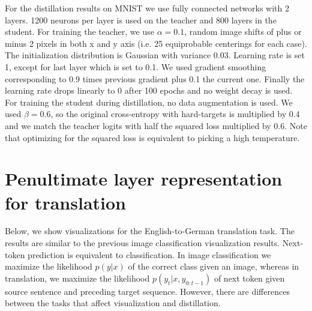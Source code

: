 \documentclass{article}
\begin{document}
For the distillation results on MNIST we use fully connected networks with 2 layers. 1200 neurons per layer is used on the teacher and 800 layers in the student. For training the teacher, we use $\alpha = 0.1$, random image shifts of plus or minus 2 pixels in both x and y axis (i.e. 25 equiprobable centerings for each case). The initialization distribution is Gaussian with variance 0.03. Learning rate is set 1, except for last layer which is set to 0.1. We used gradient smoothing corresponding to 0.9 times previous gradient plus 0.1 the current one. Finally the learning rate drops linearly to 0 after 100 epochs and no weight decay is used. For training the student during distillation, no data augmentation is used. We used $\beta = 0.6$, so the original cross-entropy with hard-targets is multiplied by 0.4 and we match the teacher logits with half the squared loss multiplied by 0.6. Note that optimizing for the squared loss is equivalent to picking a high temperature.

\section{Penultimate layer representation for translation}

Below, we show visualizations for the English-to-German translation task. The results are similar to the previous image classification visualization results. Next-token prediction is equivalent to classification. In image classification we maximize the likelihood $p(y|x)$ of the correct class given an image, whereas in %
translation, we maximize the likelihood $p(y_t|x,y_{0:t-1})$ of next token given source sentence and preceding target sequence. %
However, there are differences between the tasks that affect visualization and distillation.
\end{document}
